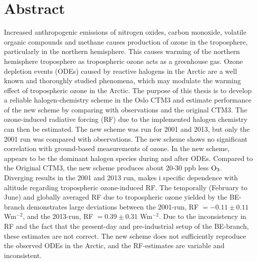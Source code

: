 \chapter*{Abstract}



Increased anthropogenic emissions of nitrogen oxides, carbon monoxide, volatile organic compounds and methane causes production of ozone in the troposphere, particularly in the northern hemisphere. This causes warming of the northern hemisphere troposphere as tropospheric ozone acts as a greenhouse gas. Ozone depletion events (ODEs) caused by reactive halogens in the Arctic are a well known and thoroughly studied phenomena, which may modulate the warming effect of tropospheric ozone in the Arctic. The purpose of this thesis is to develop a reliable halogen-chemistry scheme in the Oslo CTM3 and estimate performance of the new scheme by comparing with observations and the original CTM3. The ozone-induced radiative forcing (RF) due to the implemented halogen chemistry can then be estimated. The new scheme was run for 2001 and 2013, but only the 2001 run was compared with observations. The new scheme shows no significant correlation with ground-based measurements of ozone. In the new scheme,  appears to be the dominant halogen species during and after ODEs. Compared to the Original CTM3, the new scheme produces about 20-30 ppb less $\mathrm{O_3}$. Diverging results in the 2001 and 2013 run, makes i specific dependence with altitude regarding tropospheric ozone-induced RF. The temporally (February to June) and globally averaged RF due to tropospheric ozone yielded by the BE-branch demonstrates large deviations between the 2001-run, RF $=-0.11\pm0.11$ Wm$^{-2}$, and the 2013-run, RF $= 0.39\pm0.31$ Wm$^{-2}$. Due to the inconsistency in RF and the fact that the present-day and pre-industrial setup of the BE-branch, these estimates are not correct. The new scheme does not sufficiently reproduce the observed ODEs in the Arctic, and the RF-estimates are variable and inconsistent. 
\cleardoublepage

